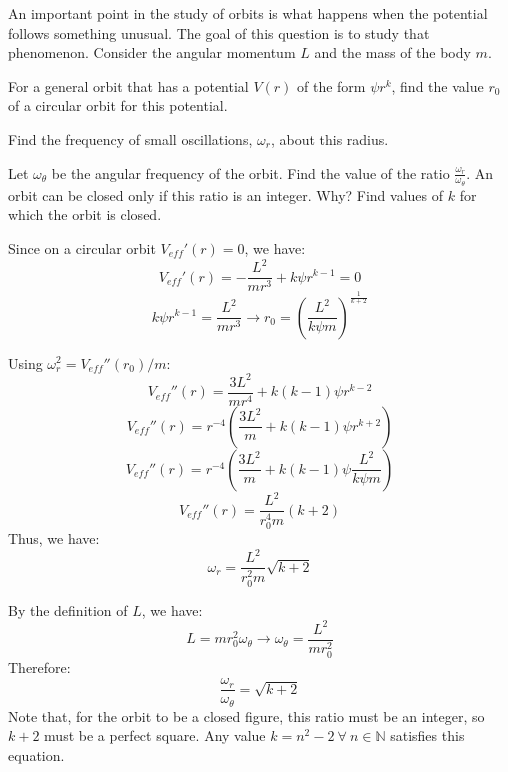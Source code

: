 \documentclass[11pt]{article}
\begin{document}
\begin{pproblem} An important point in the study of orbits is what happens when the potential follows something unusual. The goal of this question is to study that phenomenon. Consider the angular momentum \(L\) and the mass of the body \(m\).
    \begin{alternativas}
        \item For a general orbit that has a potential \(V(r)\) of the form \(\psi r^k\), find the value \(r_0\) of a circular orbit for this potential.
        
        \item Find the frequency of small oscillations, \(\omega_r\), about this radius. 
        
        \item Let \(\omega_\theta\) be the angular frequency of the orbit. Find the value of the ratio \(\frac{\omega_r}{\omega_\theta}\). An orbit can be closed only if this ratio is an integer. Why? Find values of \(k\) for which the orbit is closed.
         
    \end{alternativas} 

    \begin{pssolution*}{}{}
        \begin{alternativas}
            \item Since on a circular orbit \(V_{eff}'(r) = 0\), we have:
            \[V_{eff}'(r) = -\frac{L^2}{mr^3}+k\psi r^{k-1} = 0\]
            \[k\psi r^{k-1} = \frac{L^2}{mr^3} \rightarrow \boxed{r_0 = \left(\frac{L^2}{k\psi m}\right)^{\frac{1}{k+2}}}\]
        
            \item Using \(\omega_r^2=V_{eff}''(r_0)/m\):
            \[V_{eff}''(r) = \frac{3L^2}{mr^4}+k(k-1)\psi r^{k-2}\]
            \[V_{eff}''(r) = r^{-4}\left(\frac{3L^2}{m}+k(k-1)\psi r^{k+2}\right)\]
            \[V_{eff}''(r) = r^{-4}\left(\frac{3L^2}{m}+k(k-1)\psi \frac{L^2}{k\psi m}\right)\]
            \[V_{eff}''(r) = \frac{L^2}{r_0^4m}(k+2)\]
            Thus, we have:
            \[\boxed{\omega_r = \frac{L^2}{r_0^2m}\sqrt{k+2}}\]

            \item By the definition of \(L\), we have:
            \[L = mr_0^2\omega_\theta \rightarrow \omega_\theta = \frac{L^2}{mr_0^2}\]
            Therefore:
            \[\frac{\omega_r}{\omega_\theta} = \sqrt{k+2}\]
            Note that, for the orbit to be a closed figure, this ratio must be an integer, so \(k+2\) must be a perfect square. Any value \(k = n^2-2 \ \forall \ n \in \mathbb{N}\) satisfies this equation.
        \end{alternativas}
    \end{pssolution*}
\end{pproblem}
\end{document}
